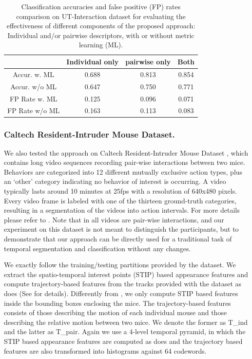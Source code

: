 \documentclass[10pt,twocolumn,letterpaper]{article}
\begin{document}
\begin{table}[h]
\centering \caption{Classification accuracies and false positive (FP) rates comparison on UT-Interaction dataset for evaluating the effectiveness of different components of the proposed approach: Individual and/or pairwise descriptors, with or without metric learning (ML).}
\footnotesize{
\begin{tabular}{|c|c|c|c|}
\hline   & Individual only & pairwise only & Both \\
\hline Accur. w. ML & 0.688 & 0.813 & 0.854  \\
\hline Accur. w/o ML & 0.647 & 0.750 & 0.771    \\
\hline FP Rate w. ML &  0.125 & 0.096 & 0.071  \\
\hline FP Rate w/o ML & 0.163 & 0.113 & 0.083\\
\hline 
\end{tabular}
}
\label{UTaccuFPdegrade}
\end{table}


\subsubsection{Caltech Resident-Intruder Mouse Dataset.} 

We also tested the approach on Caltech Resident-Intruder Mouse Dataset \cite{CRIM13}, which contains long video sequences recording pair-wise interactions between two mice. Behaviors are categorized into 12 different mutually exclusive action types, plus an `other' category indicating no behavior of interest is occurring. A video typically lasts around 10 minutes at 25fps with a resolution of 640x480 pixels. Every video frame is labeled with one of the thirteen ground-truth categories, resulting in a segmentation of the videos
into action intervals. For more details please refer to \cite{CRIM13}. Note that in all videos are pair-wise interactions, and our experiment on this dataset is not meant to distinguish the participants, but to demonstrate that our approach can be directly used for a traditional task of temporal segmentation and classification without any changes.

We exactly follow the training/testing partitions provided by the dataset. We extract the spatio-temporal interest points (STIP) based appearance features and compute trajectory-based features from the tracks provided with the dataset as \cite{CRIM13} does (See \cite{CRIM13} for details). Differently from \cite{CRIM13}, we only compute STIP based features inside the bounding boxes enclosing the mice. The trajectory-based features consists of those describing the motion of each individual mouse and those describing the relative motion between two mice. We denote the former as T\_ind and the latter as T\_pair. Again we use a 4-level temporal pyramid, in which the STIP based appearance features are computed as \cite{CRIM13} does and the trajectory based features are also transformed into histograms against 64 codewords. 
\end{document}
